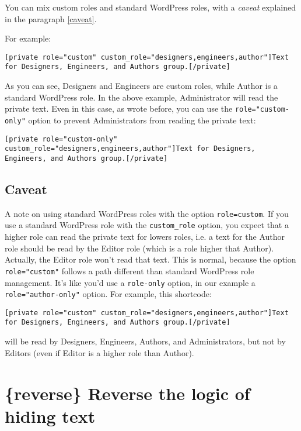 You can mix custom roles and standard WordPress roles, with a \textit{caveat}
explained in the paragraph \vref{caveat}.

For example:

\begin{lstlisting}
[private role="custom" custom_role="designers,engineers,author"]Text for Designers, Engineers, and Authors group.[/private]
\end{lstlisting}

As you can see, Designers and Engineers are custom roles, while Author is a
standard WordPress role. In the above example, Administrator will read the
private text. Even in this case, as wrote before, you can use the
\verb+role="custom-only"+ option to prevent Administrators from reading the
private text:

\begin{lstlisting}
[private role="custom-only" custom_role="designers,engineers,author"]Text for Designers, Engineers, and Authors group.[/private]
\end{lstlisting}

\subsection{Caveat}\label{caveat}

A note on using standard WordPress  roles with the option \verb+role=custom+. If you use a
standard WordPress role with the \verb+custom_role+ option, you expect that a
higher role can read the private text for lowers roles, i.e. a text for the
Author role should be read by the Editor role (which is a role higher that
Author). Actually, the Editor role won't read that text. This is normal, because
the option \verb+role="custom"+ follows a path different than standard WordPress
role management. It's like you'd use a \verb+role-only+ option, in our example a
\verb+role="author-only"+ option. For example, this shortcode:

\begin{lstlisting}
[private role="custom" custom_role="designers,engineers,author"]Text for Designers, Engineers, and Authors group.[/private]
\end{lstlisting}

\noindent will be read by Designers, Engineers, Authors, and Administrators, but
not by Editors (even if Editor is a higher role than Author).

\section{\{reverse\} Reverse the logic of hiding text}

